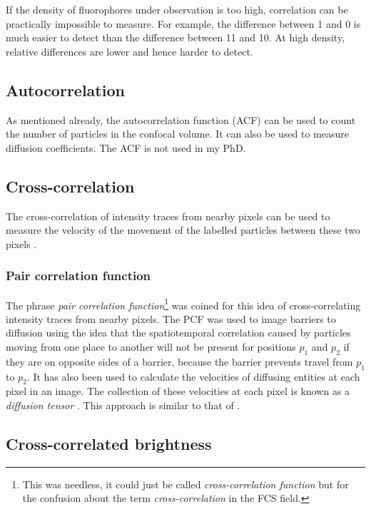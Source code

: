 \documentclass[12pt,]{book}
\let\rmarkdownfootnote\footnote%
\def\footnote{\protect\rmarkdownfootnote}
\theoremstyle{definition}
\theoremstyle{definition}
\theoremstyle{definition}
\theoremstyle{remark}
\begin{document}
If the density of fluorophores under observation is too high,
correlation can be practically impossible to measure. For example, the
difference between 1 and 0 is much easier to detect than the difference
between 11 and 10. At high density, relative differences are lower and
hence harder to detect.

\subsection{Autocorrelation}\label{autocorrelation}

As mentioned already, the autocorrelation function (ACF) can be used to
count the number of particles in the confocal volume. It can also be
used to measure diffusion coefficients. The ACF is not used in my PhD.

\subsection{Cross-correlation}\label{cross-correlation}

The cross-correlation of intensity traces from nearby pixels can be used
to measure the velocity of the movement of the labelled particles
between these two pixels \citep{STICS}.

\subsubsection{Pair correlation function}\label{PCF}

The phrase \emph{pair correlation function}\footnote{This was needless,
  it could just be called \emph{cross-correlation function} but for the
  confusion about the term \emph{cross-correlation} in the FCS field.}
was coined for this idea of cross-correlating intensity traces from
nearby pixels. The PCF was used to image barriers to diffusion
\citep{PCF} using the idea that the spatiotemporal correlation caused by
particles moving from one place to another will not be present for
positions \(p_1\) and \(p_2\) if they are on opposite sides of a
barrier, because the barrier prevents travel from \(p_1\) to \(p_2\). It
has also been used to calculate the velocities of diffusing entities at
each pixel in an image. The collection of these velocities at each pixel
is known as a \emph{diffusion tensor} \citep{DiffusionTensor}. This
approach is similar to that of \citet{STICS}.

\subsection{Cross-correlated
brightness}\label{cross-correlated-brightness}
\end{document}
